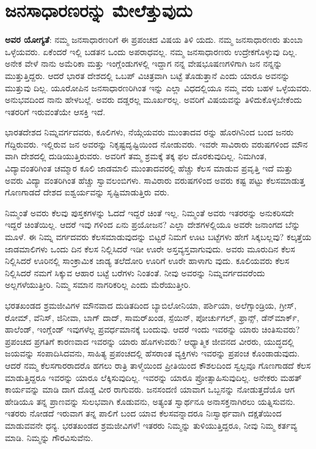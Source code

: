 
\chapter{ಜನಸಾಧಾರಣರನ್ನು ಮೇಲೆತ್ತುವುದು}

\textbf{ಅವರ ಯೋಗ್ಯತೆ}: ನಮ್ಮ ಜನಸಾಧಾರಣರಿಗೆ ಈ ಪ್ರಪಂಚದ ವಿಷಯ ತಿಳಿ ಯದು. ನಮ್ಮ ಜನಸಾಧಾರಣರು ತುಂಬಾ ಒಳ್ಳೆಯವರು. ಏಕೆಂದರೆ ಇಲ್ಲಿ ಬಡತನ ಒಂದು ಅಪರಾಧವಲ್ಲ. ನಮ್ಮ ಜನಸಾಧಾರಣರು ಉದ್ರೇಕಗೊಳ್ಳುವು ದಿಲ್ಲ. ಅನೇಕ ವೇಳೆ ನಾನು ಅಮೆರಿಕಾ ಮತ್ತು ಇಂಗ್ಲೆಂಡುಗಳಲ್ಲಿ ಇದ್ದಾಗ ನನ್ನ ವೇಷಭೂಷಣಗಳಿಗಾಗಿ ಜನ ನನ್ನನ್ನು ಮುತ್ತುತ್ತಿದ್ದರು. ಆದರೆ ಭಾರತ ದೇಶದಲ್ಲಿ ಒಬಪ್ ವಿಚಿತ್ರವಾಗಿ ಬಟ್ಟೆ ತೊಡುತ್ತಾನೆ ಎಂದು ಯಾರೂ ಅವನನ್ನು ಮುತ್ತುವು ದಿಲ್ಲ. ಯೂರೋಪಿನ ಜನಸಾಧಾರಣರಿಗಿಂತ ಇನ್ನು ಎಲ್ಲಾ ವಿಧದಲ್ಲಿಯೂ ನಮ್ಮ ವರು ಬಹಳ ಒಳ್ಳೆಯವರು. ಅನುಭವದಿಂದ ನಾನು ಹೇಳಬಲ್ಲೆ. ಅವರು ದಡ್ಡರಲ್ಲ ಮೂರ್ಖರಲ್ಲ. ಅವರಿಗೆ ವಿಷಯವನ್ನು ತಿಳಿದುಕೊಳ್ಳಬೇಕೆಂದು ಇತರರಿಗೆ ಇರುವಂತೆಯೇ ಆಸಕ್ತಿ ಇದೆ.

ಭಾರತದೇಶದ ನಿಮ್ನವರ್ಗದವರು, ಕೂಲಿಗಳು, ನೆಯ್ಗೆಯವರು ಮುಂತಾದವ ರನ್ನು ಹೊರಗಿನಿಂದ ಬಂದ ಜನರು ಗೆದ್ದಿರುವರು. ಇಲ್ಲಿರುವ ಜನ ಅವರನ್ನು ನಿಕೃಷ್ಟದೃಷ್ಟಿಯಿಂದ ನೋಡುವರು. ಇವರೇ ಸಾವಿರಾರು ವರುಷಗಳಿಂದ ಮೌನ ವಾಗಿ ದೇಶದಲ್ಲಿ ದುಡಿಯುತ್ತಿರುವರು. ಅವರಿಗೆ ತಮ್ಮ ಶ್ರಮಕ್ಕೆ ತಕ್ಕ ಫಲ ದೊರಕುವುದಿಲ್ಲ. ನಿಮಗಿಂತ, ವಿದ್ಯಾವಂತರಿಗಿಂತ ಚಮ್ಮಾರ ಕೂಲಿ ಜಾಡಮಾಲಿ ಮುಂತಾದವರಲ್ಲಿ ಹೆಚ್ಚು ಕೆಲಸ ಮಾಡುವ ಪ್ರವೃತ್ತಿ ಇದೆ ಮತ್ತು ಅವರು ವಿದ್ಯಾ ವಂತರಿಗಿಂತ ಹೆಚ್ಚು ಸ್ವಾವಲಂಬಿಗಳು. ಸಾವಿರಾರು ವರುಷಗಳಿಂದ ಅವರು ಕಷ್ಟ ಪಟ್ಟು ಕೆಲಸಮಾಡುತ್ತ ಗೊಣಗಾಡದೆ ದೇಶದ ಐಶ್ವರ್ಯವನ್ನು ಸೃಷ್ಟಿಮಾಡುತ್ತಿರು ವರು.

ನಿಮ್ಮಂತೆ ಅವರು ಕೆಲವು ಪುಸ್ತಕಗಳನ್ನು ಓದದೆ ಇದ್ದರೆ ಚಿಂತೆ ಇಲ್ಲ. ನಿಮ್ಮಂತೆ ಅವರು ಇತರರನ್ನು ಅನುಕರಿಸದೇ ಇದ್ದರೆ ಚಿಂತೆಯಿಲ್ಲ. ಆದರೆ ಇವು ಗಳಿಂದ ಏನು ಪ್ರಯೋಜನ? ಎಲ್ಲಾ ದೇಶಗಳಲ್ಲಿಯೂ ಅವರೇ ಜನಾಂಗದ ಬೆನ್ನು ಮೂಳೆ. ಈ ನಿಮ್ನ ವರ್ಗದವರು ಕೆಲಸಮಾಡುವುದನ್ನು ಬಿಟ್ಟರೆ ನಿಮಗೆ ಊಟ ಬಟ್ಟೆಗಳು ಹೇಗೆ ಸಿಕ್ಕಬಲ್ಲವು? ಕಲ್ಕತ್ತೆಯ ಜಾಡಮಾಲಿಗಳು ಒಂದು ದಿನ ಕೆಲಸ ನಿಲ್ಲಿಸಿದರೆ ಇಡೀ ಊರೇ ಅಸ್ತವ್ಯಸ್ತವಾಗುವುದು. ಅವರು ಮೂರುದಿನ ಕೆಲಸ ನಿಲ್ಲಿಸಿದರೆ ಊರಿನಲ್ಲಿ ಸಾಂಕ್ರಾಮಿಕ ಜಾಡ್ಯ ತಲೆದೋರಿ ಊರಿಗೆ ಊರೇ ಹಾಳಾಗು ವುದು. ಕೂಲಿಯವರು ಕೆಲಸ ನಿಲ್ಲಿಸಿದರೆ ನಮಗೆ ಸಿಕ್ಕುವ ಆಹಾರ ಬಟ್ಟೆ ಬರೆಗಳು ನಿಂತಂತೆ. ನೀವು ಅವರನ್ನು ನಿಮ್ನವರ್ಗದವರೆಂದು ಅಲ್ಲಗಳೆಯುತ್ತೀರಿ. ನಿಮ್ಮ ಸಮಾನ ನಾಗರಿಕರಿಲ್ಲ ಎಂದು ಮೆರೆಯುತ್ತೀರಿ.

ಭರತಖಂಡದ ಶ್ರಮಜೀವಿಗಳ ಮೌನವಾದ ದುಡಿತದಿಂದ ಬ್ಯಾಬಿಲೋನಿಯಾ, ಪರ್ಶಿಯಾ, ಅಲೆಗ್ಸಾಂಡ್ರಿಯ, ಗ್ರೀಸ್, ರೋಮ್, ವೆನಿಸ್, ಜಿನೀವಾ, ಬಾಗ್ ದಾದ್, ಸಾಮರ್​ಖಂಡ, ಸ್ಪೆಯಿನ್, ಪೋರ್ಚುಗಲ್, ಫ್ರಾನ್ಸ್, ಡೆನ್​ಮಾರ್ಕ್, ಹಾಲೆಂಡ್, ಇಂಗ್ಲೆಂಡ್ ಇವುಗಳೆಲ್ಲ ಪ್ರವರ್ಧಮಾನಕ್ಕೆ ಬಂದುವು. ಆದರೆ ಇಂದು ಇವರನ್ನು ಯಾರು ಚಿಂತಿಸುವರು? ಪ್ರಪಂಚದ ಪ್ರಗತಿಗೆ ಕಾರಣವಾದ ಇವರನ್ನು ಯಾರು ಹೊಗಳುವರು? ಆಧ್ಯಾತ್ಮಿಕ ಜೀವನದ ವೀರರು, ಯುದ್ಧದಲ್ಲಿ ಜಯವನ್ನು ಸಂಪಾದಿಸಿದವನು, ಸಾಹಿತ್ಯ ಪ್ರಪಂಚದಲ್ಲಿ ಹೆಸರಾಂತ ವ್ಯಕ್ತಿಗಳು ಇವರನ್ನು ಪ್ರಪಂಚ ಕೊಂಡಾಡುವುದು. ಆದರೆ ನಮ್ಮ ಕೆಲಸಗಾರರಾದರೊ ಹಗಲು ರಾತ್ರಿ ತಾಳ್ಮೆಯಿಂದ ಪ್ರೀತಿಯಿಂದ ಕೌಶಲದಿಂದ ಸ್ವಲ್ಪವೂ ಗೊಣಗಾಡದೆ ಕೆಲಸ ಮಾಡುತ್ತಿದ್ದರೂ ಇವರನ್ನು ಯಾರೂ ಲೆಕ್ಕಿಸುವುದಿಲ್ಲ. ಇವರನ್ನು ಯಾರೂ ಪ್ರೋತ್ಸಾಹಿಸುವುದಿಲ್ಲ. ಅನೇಕರು ಮಹತ್​ಕಾರ್ಯವನ್ನು ಮಾಡಿ ದಾಗ ದೊಡ್ಡ ವೀರ ರಾಗುವರು. ಜನಸಂದಣಿ ಯಾವಾಗ ಒಬ್ಬನನ್ನು ನೋಡುತ್ತದೆಯೊ ಆಗ ಹೇಡಿಯೂ ತನ್ನ ಪ್ರಾಣವನ್ನು ಸುಲಭವಾಗಿ ಕೊಡುವನು, ಅತ್ಯಂತ ಸ್ವಾರ್ಥನೂ ಅನಾಸಕ್ತನಾಗಿರಲು ಯತ್ನಿಸುವನು. ಇತರರು ನೋಡದೆ ಇರುವಾಗ ತನ್ನ ಪಾಲಿಗೆ ಬಂದ ಯಾವ ಕೆಲಸವನ್ನಾದರೂ ನಿಃಸ್ವಾರ್ಥವಾಗಿ ದಕ್ಷತೆಯಿಂದ ಮಾಡುವವನೇ ಧನ್ಯ. ಭರತಖಂಡದ ಶ್ರಮಜೀವಿಗಳೆ! ಇತರರು ನಿಮ್ಮನ್ನು ತುಳಿಯುತ್ತಿದ್ದರೂ, ನೀವು ನಿಮ್ಮ ಕರ್ತವ್ಯ ಮಾಡಿ. ನಿಮ್ಮನ್ನು ಗೌರವಿಸುವೆನು.

